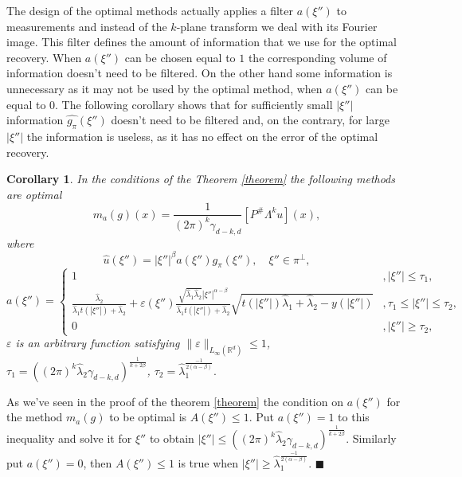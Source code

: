 \documentclass[12pt]{iopart}
\newtheorem{corollary}{Corollary}
\newenvironment{proof}
{\par\noindent{\bf Proof}}
{\hfill$\scriptstyle\blacksquare$}
\begin{document}
The design of the optimal methods actually applies a filter $a(\xi'')$ to measurements and instead of the $k$-plane transform we deal with its Fourier image. This filter defines the amount of information that we use for the optimal recovery. When $a(\xi'')$ can be chosen equal to $1$ the corresponding volume of information doesn't need to be filtered. On the other hand some information is unnecessary as it may not be used by the optimal method, when $a(\xi'')$ can be equal to $0$. The following corollary shows that for sufficiently small  $|\xi''|$ information $\widehat{g_\pi}(\xi'')$ doesn't need to be filtered and, on the contrary, for large  $|\xi''|$ the information is useless, as it  has no effect on the error of the optimal recovery.

\begin{corollary}
\label{cor}
In the conditions of the Theorem \ref{theorem} the following methods are optimal 
    $$m_a(g)(x) = \frac{1}{(2\pi)^k\gamma_{d-k,d}}[P^\#\Lambda^ku](x),$$
where	
	$$\widehat{u}(\xi'')=|\xi''|^\beta a(\xi'')\widehat{g_\pi }(\xi''),\quad \xi''\in\pi^\perp,$$
    \[
    a(\xi'')=
    \begin{cases}
    1& ,|\xi''|\leqslant \tau_1,\\
    \frac{\widehat\lambda_2}{\widehat\lambda_1t(|\xi''|)+\widehat\lambda_2}+\varepsilon(\xi'')\frac{\sqrt{\widehat\lambda_1\widehat\lambda_2}|\xi''|^{\alpha-\beta}}{\widehat\lambda_1t(|\xi''|)+\widehat\lambda_2}\sqrt{t(|\xi''|)\widehat\lambda_1+\widehat\lambda_2-y(|\xi''|)}& ,\tau_1 \leqslant|\xi''|\leqslant\tau_2,\\
    0 &,|\xi''|\geqslant\tau_2,
    \end{cases}
    \]
$\varepsilon$ is an arbitrary function satisfying $\|\varepsilon\|_{L_\infty(\mathbb R^d)}\leqslant 1$, $\tau_1=((2\pi)^k\widehat\lambda_2\gamma_{d-k,d})^\frac{1}{k+2\beta}$, $\tau_2=\widehat\lambda_1^{\frac{-1}{2(\alpha-\beta)}}.$
\end{corollary}

\begin{proof}
As we've seen in the proof of the theorem \ref{theorem} the condition on $a(\xi'')$ for the method $m_a(g)$ to be optimal is $A(\xi'')\leqslant 1$. Put $a(\xi'')=1$ to this inequality and solve it for $\xi''$ to obtain $|\xi''|\leqslant ((2\pi)^k\widehat\lambda_2\gamma_{d-k,d})^\frac{1}{k+2\beta}$. Similarly put $a(\xi'')=0$,
  then $A(\xi'')\leqslant 1$ is true when $|\xi''|\geqslant
  \widehat\lambda_1^{\frac{-1}{2(\alpha-\beta)}}$.
\end{proof}
\end{document}
